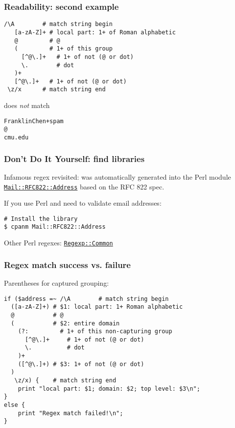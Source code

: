 \begin{frame}[fragile]
  \frametitle{Readability: second example}

  \begin{verbatim}
/\A        # match string begin
   [a-zA-Z]+ # local part: 1+ of Roman alphabetic
   @         # @
   (         # 1+ of this group
     [^@\.]+   # 1+ of not (@ or dot)
     \.        # dot
   )+
   [^@\.]+   # 1+ of not (@ or dot)
 \z/x      # match string end
  \end{verbatim}

  does \emph{not} match

  \begin{verbatim}
FranklinChen+spam
@
cmu.edu
  \end{verbatim}
\end{frame}

\begin{frame}[fragile]
  \frametitle{Don't Do It Yourself: find libraries}

  Infamous regex revisited: was automatically generated into the Perl module \href{http://search.cpan.org/~pdwarren/Mail-RFC822-Address-0.3/Address.pm}{\texttt{Mail::RFC822::Address}} based on the RFC 822 spec.

  If you use Perl and need to validate email addresses:
  \begin{verbatim}
# Install the library
$ cpanm Mail::RFC822::Address
  \end{verbatim}

  Other Perl regexes: \href{http://search.cpan.org/dist/Regexp-Common/}{\texttt{Regexp::Common}}
\end{frame}

%

\begin{frame}[fragile]
  \frametitle{Regex match success vs. failure}

  Parentheses for captured grouping:
  \begin{verbatim}
if ($address =~ /\A        # match string begin
  ([a-zA-Z]+) # $1: local part: 1+ Roman alphabetic
  @           # @
  (           # $2: entire domain
    (?:         # 1+ of this non-capturing group
      [^@\.]+     # 1+ of not (@ or dot)
      \.          # dot
    )+
    ([^@\.]+) # $3: 1+ of not (@ or dot)
  )
   \z/x) {    # match string end
    print "local part: $1; domain: $2; top level: $3\n";
}
else {
    print "Regex match failed!\n";
}
  \end{verbatim}
\end{frame}

